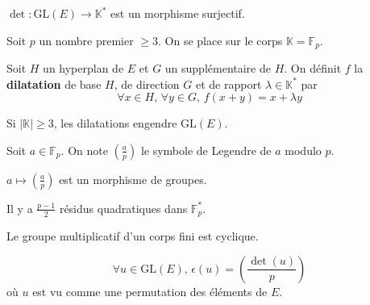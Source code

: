 	
	\begin{proposition}
		$\det : \mathrm{GL}(E) \rightarrow \mathbb{K}^*$ est un morphisme surjectif.
	\end{proposition}
	
	
	Soit $p$ un nombre premier $\geq 3$. On se place sur le corps $\mathbb{K} = \mathbb{F}_p$.
	
	\begin{definition}
		Soit $H$ un hyperplan de $E$ et $G$ un supplémentaire de $H$. On définit $f$ la \textbf{dilatation} de base $H$, de direction $G$ et de rapport $\lambda \in \mathbb{K}^*$ par
		\[ \forall x \in H, \, \forall y \in G, \, f(x+y) = x + \lambda y \]
	\end{definition}
	
	\begin{theorem}
		Si $|\mathbb{K}| \geq 3$, les dilatations engendre $\mathrm{GL}(E)$.
	\end{theorem}
	
	\begin{notation}
		Soit $a \in \mathbb{F}_p$. On note $\left( \frac{a}{p} \right)$ le symbole de Legendre de $a$ modulo $p$.
	\end{notation}
	
	\begin{lemma}
		$a \mapsto \left( \frac{a}{p} \right)$ est un morphisme de groupes.
	\end{lemma}
	
	\begin{lemma}
		Il y a $\frac{p-1}{2}$ résidus quadratiques dans $\mathbb{F}_p^*$.
	\end{lemma}
	
	\begin{theorem}
		Le groupe multiplicatif d'un corps fini est cyclique.
	\end{theorem}
	
	\begin{theorem}
		\[ \forall u \in \mathrm{GL}(E), \, \epsilon(u) = \left( \frac{\det(u)}{p} \right) \]
		où $u$ est vu comme une permutation des éléments de $E$.
	\end{theorem}

